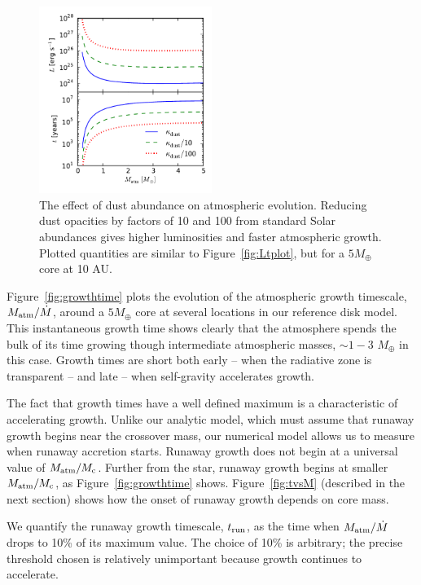 \documentclass[apj, numberedappendix]{emulateapj}
\newcommand{\Fig}[1]{Figure~\ref{#1}}
\newcommand{\co}{_{\rm c}}
\begin{document}
\begin{figure}[tb]
\centering
\includegraphics[width=0.5\textwidth]{../../figs/ModelAtmospheres/RadSelfGravPoly/PaperFigs/opacity_effect.pdf}
\caption{The effect of dust abundance on atmospheric evolution.   Reducing dust opacities by factors of 10 and 100 from standard Solar abundances gives higher luminosities and faster atmospheric growth.  Plotted quantities are similar to \Fig{fig:Ltplot}, but for a $5 M_{\oplus}$ core at 10 AU. }  %
\label{fig:LtvsMopacity}
\end{figure}

\Fig{fig:growthtime} plots the evolution of the atmospheric growth timescale, $M_{\rm atm}/\dot{M}$,  around a $5 M_{\oplus}$ core at several locations in our reference disk model.  This instantaneous growth time shows clearly that the atmosphere spends the bulk of its time growing though intermediate atmospheric masses, $\sim 1 -3$ $M_\oplus$ in this case.  Growth times are short both early -- when the radiative zone is transparent -- and late -- when self-gravity accelerates growth.  

The fact that growth times have a well defined maximum is a characteristic of accelerating growth.  Unlike our analytic model, which must assume that runaway growth begins near the crossover mass, our numerical model allows us to measure when runaway accretion starts.  Runaway growth does not begin at a universal value of $M_{\rm atm}/M\co$.  Further from the star, runaway growth begins at smaller $M_{\rm atm}/M\co$, as \Fig{fig:growthtime} shows.  \Fig{fig:tvsM} (described in the next section) shows how the onset of runaway growth depends on core mass. 

We quantify the runaway growth timescale, $t_{\rm run}$, as the time when $M_{\rm atm}/\dot{M}$ drops to 10\% of its maximum value.  The choice of 10\% is arbitrary; the precise threshold chosen is relatively unimportant because growth continues to accelerate.
\end{document}
